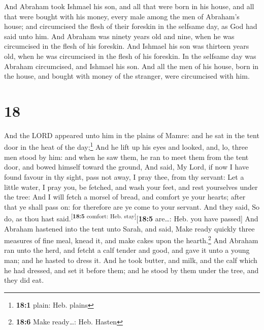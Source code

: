  And Abraham took Ishmael his son, and all that were born
in his house, and all that were bought with his money, every male among
the men of Abraham's house; and circumcised the flesh of their foreskin
in the selfsame day, as God had said unto him.  And
Abraham was ninety years old and nine, when he was circumcised in the
flesh of his foreskin.  And Ishmael his son was thirteen
years old, when he was circumcised in the flesh of his foreskin.
 In the selfsame day was Abraham circumcised, and Ishmael
his son.  And all the men of his house, born in the
house, and bought with money of the stranger, were circumcised with him.

\hypertarget{section-17}{%
\section{18}\label{section-17}}

 And the LORD appeared unto him in the plains of Mamre:
and he sat in the tent door in the heat of the day;\footnote{\textbf{18:1}
  plain: Heb. plains}  And he lift up his eyes and looked,
and, lo, three men stood by him: and when he saw them, he ran to meet
them from the tent door, and bowed himself toward the ground,
 And said, My Lord, if now I have found favour in thy
sight, pass not away, I pray thee, from thy servant:  Let
a little water, I pray you, be fetched, and wash your feet, and rest
yourselves under the tree:  And I will fetch a morsel of
bread, and comfort ye your hearts; after that ye shall pass on: for
therefore are ye come to your servant. And they said, So do, as thou
hast said.\textsuperscript{{[}\textbf{18:5} comfort: Heb.
stay{]}}{[}\textbf{18:5} are\ldots: Heb. you have passed{]}
 And Abraham hastened into the tent unto Sarah, and said,
Make ready quickly three measures of fine meal, knead it, and make cakes
upon the hearth.\footnote{\textbf{18:6} Make ready\ldots: Heb. Hasten}
 And Abraham ran unto the herd, and fetcht a calf tender
and good, and gave it unto a young man; and he hasted to dress it.
 And he took butter, and milk, and the calf which he had
dressed, and set it before them; and he stood by them under the tree,
and they did eat.

